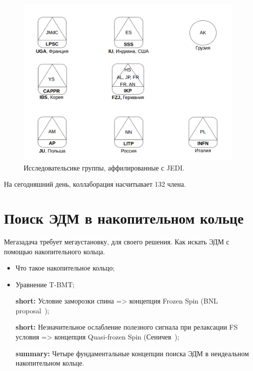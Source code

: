 \documentclass{extarticle}
\begin{document}
\begin{figure}
	\includegraphics[scale=.4]{img/JEDI_architecture}
	\caption{Исследовательсике группы, аффилированные с JEDI.}
\end{figure}


На сегодняшний день, коллаборация насчитывает 132 члена.

\section{Поиск ЭДМ в накопительном кольце}
Мегазадача требует мегаустановку, для своего решения. Как искать ЭДМ с помощью накопительного кольца.
	\begin{itemize}
		\item Что такое накопительное кольцо;
		\item Уравнение T-BMT;
		\item[\textbf{short:}] Условие заморозки спина => концепция Frozen Spin (BNL proposal~\cite{BNL});
		\item[\textbf{short:}] Незначительное ослабление полезного сигнала при релаксации FS условия => концепция Quasi-frozen Spin (Сеничев~\cite{Senichev});
		\item[\textbf{summary:}] Четыре фундаментальные концепции поиска ЭДМ в неидеальном накопительном кольце.
	\end{itemize}
	
\end{document}
